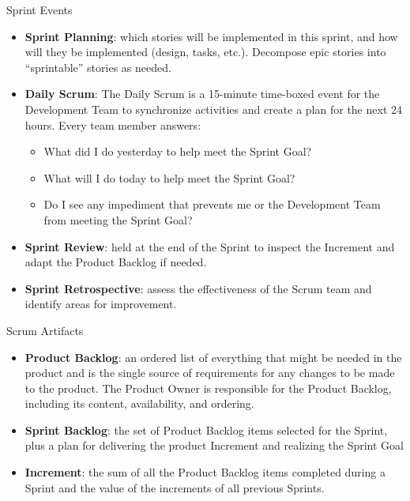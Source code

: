 \documentclass{beamer}
\begin{document}
\begin{frame}[fragile]{Sprint Events}


\begin{itemize}
\item {\bf Sprint Planning}: which stories will be implemented in this sprint, and how will they be implemented (design, tasks, etc.).  Decompose epic stories into ``sprintable'' stories as needed.
\item {\bf Daily Scrum}: The Daily Scrum is a 15-minute time-boxed event for the Development Team to synchronize activities and create a plan for the next 24 hours.  Every team member answers:
\begin{itemize}
\item What did I do yesterday to help meet the Sprint Goal?
\item What will I do today to help meet the Sprint Goal?
\item Do I see any impediment that prevents me or the Development Team from meeting the Sprint Goal?
\end{itemize}
\item {\bf Sprint Review}: held at the end of the Sprint to inspect the Increment and adapt the Product Backlog if needed.
\item {\bf Sprint Retrospective}: assess the effectiveness of the Scrum team and identify areas for improvement.
\end{itemize}


\end{frame}

\begin{frame}[fragile]{Scrum Artifacts}


\begin{itemize}
\item {\bf Product Backlog}: an ordered list of everything that might be needed in the product and is the single source of requirements for any changes to be made to the product. The Product Owner is responsible for the Product Backlog, including its content, availability, and ordering.
\item {\bf Sprint Backlog}: the set of Product Backlog items selected for the Sprint, plus a plan for delivering the product Increment and realizing the Sprint Goal
\item {\bf Increment}: the sum of all the Product Backlog items completed during a Sprint and the value of the increments of all previous Sprints.
\end{itemize}


\end{frame}
\end{document}
